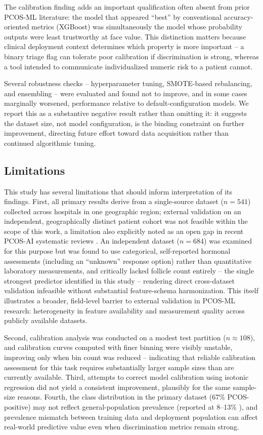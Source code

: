 \documentclass[conference]{IEEEtran}
\begin{document}
The calibration finding adds an important qualification often absent from prior PCOS-ML literature: the model that appeared ``best'' by conventional accuracy-oriented metrics (XGBoost) was simultaneously the model whose probability outputs were least trustworthy at face value. This distinction matters because clinical deployment context determines which property is more important -- a binary triage flag can tolerate poor calibration if discrimination is strong, whereas a tool intended to communicate individualized numeric risk to a patient cannot.

Several robustness checks -- hyperparameter tuning, SMOTE-based rebalancing, and ensembling -- were evaluated and found not to improve, and in some cases marginally worsened, performance relative to default-configuration models. We report this as a substantive negative result rather than omitting it: it suggests the dataset size, not model configuration, is the binding constraint on further improvement, directing future effort toward data acquisition rather than continued algorithmic tuning.

\subsection{Limitations}

This study has several limitations that should inform interpretation of its findings. First, all primary results derive from a single-source dataset ($n=541$) collected across hospitals in one geographic region; external validation on an independent, geographically distinct patient cohort was not feasible within the scope of this work, a limitation also explicitly noted as an open gap in recent PCOS-AI systematic reviews \cite{ghaderzadeh2025}. An independent dataset ($n=684$) was examined for this purpose but was found to use categorical, self-reported hormonal assessments (including an ``unknown'' response option) rather than quantitative laboratory measurements, and critically lacked follicle count entirely -- the single strongest predictor identified in this study -- rendering direct cross-dataset validation infeasible without substantial feature-schema harmonization. This itself illustrates a broader, field-level barrier to external validation in PCOS-ML research: heterogeneity in feature availability and measurement quality across publicly available datasets.

Second, calibration analysis was conducted on a modest test partition ($n \approx 108$), and calibration curves computed with finer binning were visibly unstable, improving only when bin count was reduced -- indicating that reliable calibration assessment for this task requires substantially larger sample sizes than are currently available. Third, attempts to correct model calibration using isotonic regression did not yield a consistent improvement, plausibly for the same sample-size reasons. Fourth, the class distribution in the primary dataset (67\% PCOS-positive) may not reflect general-population prevalence (reported at 8--13\% \cite{ghaderzadeh2025}), and prevalence mismatch between training data and deployment population can affect real-world predictive value even when discrimination metrics remain strong.
\end{document}

